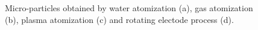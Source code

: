 \begin{figure}[H]
    \qquad
    
    \caption[Powders from atomization processes]{Micro-particles obtained by water atomization (a), gas atomization (b), plasma atomization (c) and rotating electode process (d).}
    \label{fig:powders}
\end{figure}
